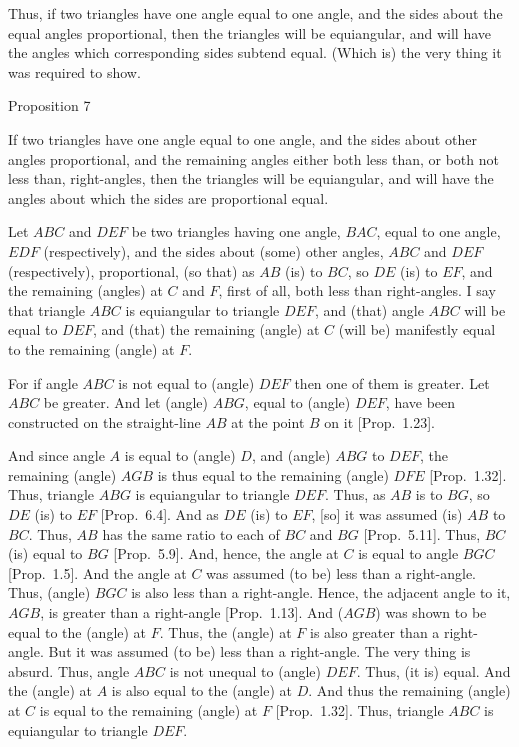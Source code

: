 Thus, if two triangles have one angle equal to one angle,
and the sides about the equal angles proportional, then the triangles will
be equiangular, and will have the angles which corresponding sides subtend equal. (Which is) the very thing it was required to show.


\begin{center}
{\large Proposition 7}
\end{center}

If two triangles have one angle equal to one angle,
and the sides about  other angles proportional, and the remaining angles
either both less than, or both not less than, right-angles, then the triangles will
be equiangular, and will have the angles about which the sides are proportional equal.

\epsfysize=2.2in
\centerline{}

Let $ABC$ and $DEF$ be two triangles having one angle, $BAC$,  equal to one angle, $EDF$ (respectively), and  the sides about (some) other angles, $ABC$ and
$DEF$ (respectively), proportional, (so that) as $AB$ (is) to $BC$, so
$DE$ (is) to $EF$, and the remaining (angles) at $C$ and $F$, first of all, both
less than right-angles. I say that triangle $ABC$ is equiangular to triangle
$DEF$, and (that) angle $ABC$ will be equal to $DEF$, and (that) the remaining  (angle) at $C$
(will be) manifestly equal to the remaining (angle) at $F$.

For if angle $ABC$ is not equal to (angle) $DEF$ then one of them is greater.
Let $ABC$ be greater. And let (angle) $ABG$, equal to (angle) $DEF$, have been constructed on the straight-line $AB$  at the point $B$  on it [Prop.~1.23].

And since angle $A$ is equal to (angle) $D$, and (angle) $ABG$ to $DEF$, the remaining
(angle) $AGB$ is thus equal to the remaining (angle) $DFE$  [Prop.~1.32].
Thus, triangle $ABG$ is equiangular to triangle $DEF$. Thus, as $AB$ is to
$BG$, so $DE$ (is) to $EF$ [Prop.~6.4]. 
And as $DE$ (is) to $EF$, [so] it was assumed (is) $AB$ to $BC$. Thus, $AB$ has the
same ratio to each of $BC$ and $BG$ [Prop.~5.11].
Thus, $BC$ (is) equal to $BG$ [Prop.~5.9].
And, hence, the angle at $C$ is equal to angle $BGC$  [Prop.~1.5].
And the angle at $C$ was assumed (to be) less than a right-angle.
Thus, (angle) $BGC$ is also less than a right-angle. Hence, the adjacent
angle to it, $AGB$, is greater than a right-angle [Prop.~1.13].
And ($AGB$) was shown to be equal to the (angle) at $F$. Thus, the (angle)
at $F$ is also greater than a right-angle. But it was assumed (to be)
less than a right-angle. The very thing is absurd. Thus, angle $ABC$ is
not unequal to (angle) $DEF$. Thus, (it is) equal. And the (angle) at $A$ is also
equal to the (angle) at $D$. And thus the remaining (angle) at $C$ is equal
to the remaining (angle) at $F$  [Prop.~1.32]. Thus, triangle $ABC$
is equiangular to triangle $DEF$.


